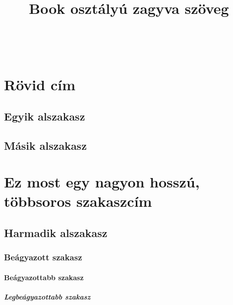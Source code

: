 \documentclass[]{book}
\begin{document}
\title{Book osztályú zagyva szöveg}
\maketitle
\frontmatter
\tableofcontents
\clearpage
~
\clearpage
\mainmatter
\section[1. szakasz]{Rövid cím}
\subsection{Egyik alszakasz}
\hulipsum[1-4]
\subsection{Másik alszakasz}
\hulipsum[5-8]
\section[2. szakasz]{Ez most egy nagyon hosszú, többsoros szakaszcím}
\subsection{Harmadik alszakasz}
\hulipsum[9-10]
\subsubsection{Beágyazott szakasz}
\hulipsum[11-12]
\paragraph{Beágyazottabb szakasz}
\hulipsum[13-14]
\subparagraph{Legbeágyazottabb szakasz}
\hulipsum[14-15]
\end{document}
